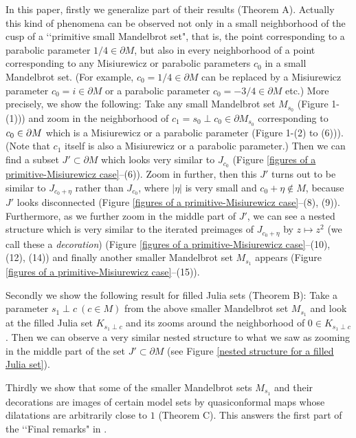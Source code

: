 In this paper, firstly we generalize part of their results (Theorem A).
Actually this kind of phenomena can be observed not only in a small 
neighborhood of the cusp of a \lq\lq primitive small Mandelbrot set", that 
is, the point corresponding to a parabolic parameter $1/4 \in \partial M$, 
but also in every neighborhood of a point corresponding to any Misiurewicz 
or parabolic parameters $c_0$ in a small Mandelbrot set. (For example, 
$c_0=1/4 \in \partial M$ can be replaced by a Misiurewicz parameter 
$c_0=i\in \partial M$ or a parabolic parameter $c_0=-3/4 \in \partial M$ etc.) 
More precisely, we show the following: Take any small Mandelbrot set 
$M_{s_0}$ (Figure 1-(1))) and zoom in the neighborhood of 
$c_1 = s_0 \perp c_0 \in \partial M_{s_0}$ corresponding to $c_0 \in \partial M$ 
which is a Misiurewicz or a parabolic parameter (Figure 1-(2) to (6))). 
(Note that $c_1$ itself is also a Misiurewicz or a parabolic parameter.) 
Then we can find a subset $J' \subset \partial M$ which looks very similar to
$J_{c_0}$ (Figure \ref{figures of a primitive-Misiurewicz case}--(6)). 
Zoom in further, then this $J'$ turns out to be similar to $J_{c_0+\eta}$
rather than $J_{c_0}$, 
where $|\eta|$ is very small and $c_0+\eta \notin M$, 
because $J'$ looks disconnected 
(Figure \ref{figures of a primitive-Misiurewicz case}--(8), (9)). 
Furthermore, as we further zoom in the middle part of $J'$, we can see a 
nested structure which is very similar to the iterated preimages of 
$J_{c_0+\eta}$ by $z \mapsto z^2$ (we call these a {\it decoration})
(Figure \ref{figures of a primitive-Misiurewicz case}--(10), (12), (14))
and finally another smaller Mandelbrot set $M_{s_1}$ appears
(Figure \ref{figures of a primitive-Misiurewicz case}--(15)). 



Secondly we show the following result for filled Julia sets (Theorem B): 
Take a parameter $s_1 \perp c \ (c \in M)$ from the above smaller Mandelbrot
set $M_{s_1}$ and look at the filled Julia set $K_{s_1 \perp c}$ and its 
zooms around the neighborhood of $0 \in K_{s_1 \perp c}$. Then we can observe
a very similar nested structure to what we saw as zooming in the middle
part of the set $J' \subset \partial M$ 
(see Figure \ref{nested structure for a filled Julia set}). 



Thirdly we show that some of the smaller Mandelbrot sets $M_{s_1}$ and their 
decorations are images of  certain model sets by quasiconformal maps whose 
dilatations are arbitrarily close to $1$ (Theorem C). This answers the first
part of the \lq\lq Final remarks" in \cite[p.35]{Douady 2000}.

